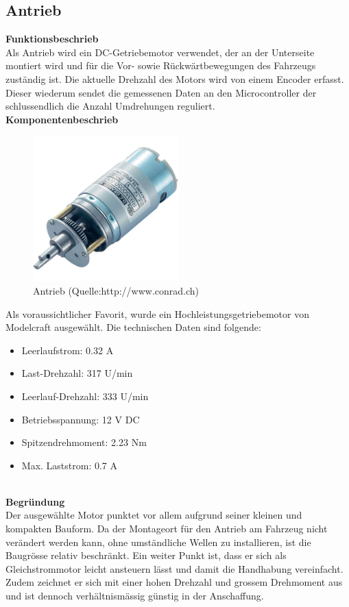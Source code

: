 \subsection{Antrieb}

\textbf{Funktionsbeschrieb}\\[0.2cm]
Als Antrieb wird ein DC-Getriebemotor verwendet, der an der Unterseite montiert wird und für die Vor- sowie Rückwärtbewegungen des Fahrzeugs zuständig ist.
Die aktuelle Drehzahl des Motors wird von einem Encoder erfasst. Dieser wiederum sendet die gemessenen Daten an den Microcontroller der schlussendlich die Anzahl Umdrehungen reguliert.\\[0.2cm]
\textbf{Komponentenbeschrieb}
\begin{figure}[h]
\centering
\includegraphics[width=0.5\textwidth]{03_Loesungskonzept/pictures/antrieb.jpg}
\caption{Antrieb  (Quelle:http://www.conrad.ch)}	
\end{figure}\flushleft
Als voraussichtlicher Favorit, wurde ein Hochleistungsgetriebemotor von Modelcraft ausgewählt. Die technischen Daten sind folgende:
\begin{itemize}
\item Leerlaufstrom: 0.32 A
\item Last-Drehzahl: 317 U/min
\item Leerlauf-Drehzahl: 333 U/min
\item Betriebsspannung: 12 V DC
\item Spitzendrehmoment: 2.23 Nm
\item Max. Laststrom: 0.7 A
\end{itemize}\\[0.2cm]
\textbf{Begründung}\\[0.2cm]
Der ausgewählte Motor punktet vor allem aufgrund seiner kleinen und kompakten Bauform. Da der Montageort für den Antrieb am Fahrzeug nicht verändert werden kann, ohne umständliche Wellen zu installieren, ist die Baugrösse relativ beschränkt.
Ein weiter Punkt ist, dass er sich als Gleichstrommotor leicht ansteuern lässt und damit die Handhabung vereinfacht.
Zudem zeichnet er sich mit einer hohen Drehzahl und grossem Drehmoment aus und ist dennoch verhältnismässig günstig in der Anschaffung.\\[0.2cm]
